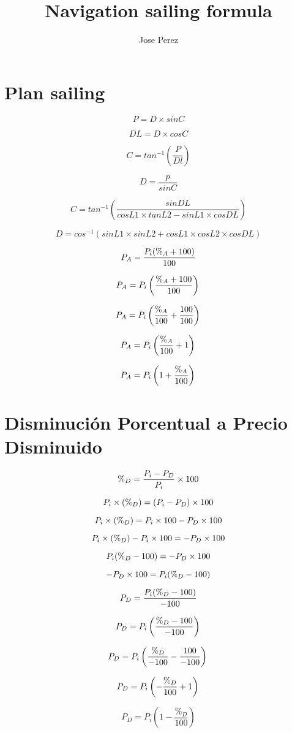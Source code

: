 \documentclass[10pt]{article}         %
\title{Navigation sailing formula}
\author{Jose Perez}
\begin{document}
\maketitle

\section{Plan sailing}
$$
P=D\times{sinC}
$$

$$
DL=D\times{cosC}
$$

$$
C=tan^{-1}(\frac{P}{Dl})
$$

$$
D=\frac{p}{sinC}
$$

$$
C=tan^{-1}(\frac{sinDL}{{cosL1}\times{tanL2}-{sinL1}\times{cosDL}})
$$

$$
D=cos^{-1}({sinL1}\times{sinL2}+{cosL1}\times{cosL2}\times{cosDL})
$$

$$
P_A=\frac{P_i(\%_A+100)}{100} \\
$$

$$
P_A=P_i\left (\frac{\%_A+100}{100}  \right ) \\
$$

$$
P_A=P_i\left (\frac{\%_A}{100}+\frac{100}{100}  \right ) \\
$$

$$
P_A=P_i\left (\frac{\%_A}{100}+1  \right ) \\
$$

$$
P_A=P_i\left (1+\frac{\%_A}{100}  \right ) \\
$$

\newpage

\section{Disminuci\'on Porcentual a Precio Disminuido}
$$
\%_D=\frac{P_i-P_D}{P_i}\times 100 \\
$$

$$
P_i\times(\%_D)=(P_i-P_D)\times 100 \\
$$

$$
P_i\times(\%_D)=P_i\times 100-P_D\times 100 \\
$$

$$
P_i\times(\%_D)-P_i\times 100=-P_D\times 100 \\
$$

$$
P_i(\%_D-100)=-P_D\times 100 \\
$$

$$
-P_D\times 100=P_i(\%_D-100) \\
$$

$$
P_D=\frac{P_i(\%_D-100)}{-100} \\
$$

$$
P_D=P_i\left (\frac{\%_D-100}{-100}  \right ) \\
$$

$$
P_D=P_i\left (\frac{\%_D}{-100}-\frac{100}{-100}  \right ) \\
$$

$$
P_D=P_i\left (-\frac{\%_D}{100}+1  \right ) \\
$$

$$
P_D=P_i\left (1-\frac{\%_D}{100}  \right )
$$
\end{document}
